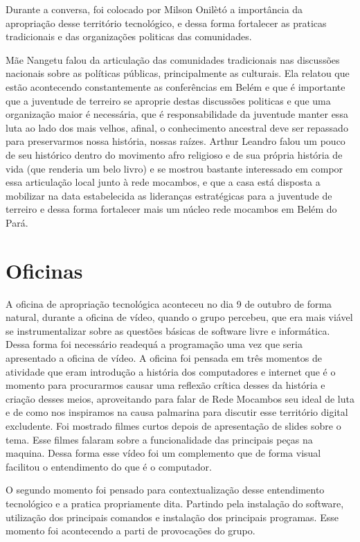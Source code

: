 \documentclass[a4paper, 11pt, oneside]{Relatorio_sem}  %
\begin{document}
Durante a conversa, foi colocado por Milson Onilètó a importância da
apropriação desse território tecnológico, e dessa forma fortalecer as
praticas tradicionais e das organizações politicas das comunidades.

Mãe Nangetu falou da articulação das comunidades tradicionais nas
discussões nacionais sobre as políticas públicas, principalmente as
culturais. Ela relatou que estão acontecendo constantemente as
conferências em Belém e que é importante que a juventude de terreiro
se aproprie destas discussões politicas e que uma organização maior é
necessária, que é responsabilidade da juventude manter essa luta ao
lado dos mais velhos, afinal, o conhecimento ancestral deve ser
repassado para preservarmos nossa história, nossas raízes. Arthur
Leandro falou um pouco de seu histórico dentro do movimento afro
religioso e de sua própria história de vida (que renderia um belo
livro) e se mostrou bastante interessado em compor essa articulação
local junto à rede mocambos, e que a casa está disposta a mobilizar na
data estabelecida as lideranças estratégicas para a juventude de
terreiro e dessa forma fortalecer mais um núcleo rede mocambos em
Belém do Pará.  

\section{Oficinas}
A oficina de apropriação tecnológica aconteceu no dia 9 de outubro de
forma natural, durante a oficina de vídeo, quando o grupo percebeu,
que era mais viável se instrumentalizar sobre as questões básicas de
software livre e informática. Dessa forma foi necessário readequá a
programação uma vez que seria apresentado a oficina de vídeo. A
oficina foi pensada em três momentos de atividade que eram introdução
a história dos computadores e internet que é o momento para
procurarmos causar uma reflexão crítica desses da história e criação
desses meios, aproveitando para falar de Rede Mocambos seu ideal de
luta e de como nos inspiramos na causa palmarina para discutir esse
território digital excludente. Foi mostrado filmes curtos depois de
apresentação de slides sobre o tema. Esse filmes falaram sobre a
funcionalidade das principais peças na maquina. Dessa forma esse vídeo
foi um complemento que de forma visual facilitou o entendimento do que
é o computador.

O segundo momento foi pensado para contextualização desse entendimento
tecnológico e a pratica propriamente dita. Partindo pela instalação do
software, utilização dos principais comandos e instalação dos
principais programas. Esse momento foi acontecendo a parti de
provocações do grupo.
\end{document}
